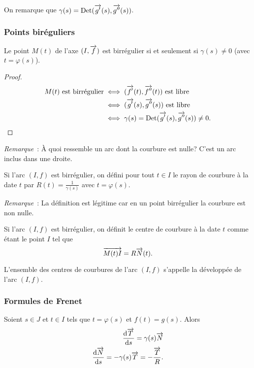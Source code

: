 On remarque que \(\gamma(s)=\operatorname{Det}(\overrightarrow{g'}(s), \overrightarrow{g''}(s))\).

\subsubsection{Points biréguliers}

\begin{prop}
  Le point \(M(t)\) de l'axe \((I, \overrightarrow{f})\) est birrégulier si et seulement si \(\gamma(s)\neq 0\) (avec \(t=\varphi(s)\)).
\end{prop}
\begin{proof}
  \begin{align}
    M(t) \text{~est birrégulier} &\iff (\overrightarrow{f'}(t), \overrightarrow{f''}(t)) \text{~est libre}\\
    &\iff (\overrightarrow{g'}(s), \overrightarrow{g''}(s)) \text{~est libre}\\
    &\iff \gamma(s)=\operatorname{Det}(\overrightarrow{g'}(s), \overrightarrow{g''}(s)) \neq 0.
  \end{align}
\end{proof}

\emph{Remarque}~: À quoi ressemble un arc dont la courbure est nulle? C'est un arc inclus dans une droite.

\begin{defdef}
  Si l'arc \((I,f)\) est birrégulier, on défini pour tout \(t \in I\) le rayon de courbure à la date \(t\) par \(R(t) = \frac{1}{\gamma(s)}\) avec \(t=\varphi(s)\).
\end{defdef}

\emph{Remarque}~: La définition est légitime car en un point birrégulier la courbure est non nulle.

\begin{defdef}
  Si l'arc \((I,f)\) est birrégulier, on définit le centre de courbure à la date \(t\) comme étant le point \(I\) tel que
  \begin{equation}
    \overrightarrow{M(t)I} = R \overrightarrow{N}(t).
  \end{equation}
\end{defdef}
L'ensemble des centres de courbures de l'arc \((I, f)\) s'appelle la développée de l'arc \((I, f)\).

\subsubsection{Formules de Frenet}

Soient \(s \in J\) et \(t \in I\) tels que \(t=\varphi(s)\) et \(f(t)=g(s)\). Alors
\begin{align}
  \dfrac{\mathrm{d} \overrightarrow{T}}{\mathrm{d} s} = \gamma(s) \overrightarrow{N} \\
  \dfrac{\mathrm{d} \overrightarrow{N}}{\mathrm{d} s} = -\gamma(s)\overrightarrow{T}=-\frac{\overrightarrow{T}}{R}.
\end{align}

